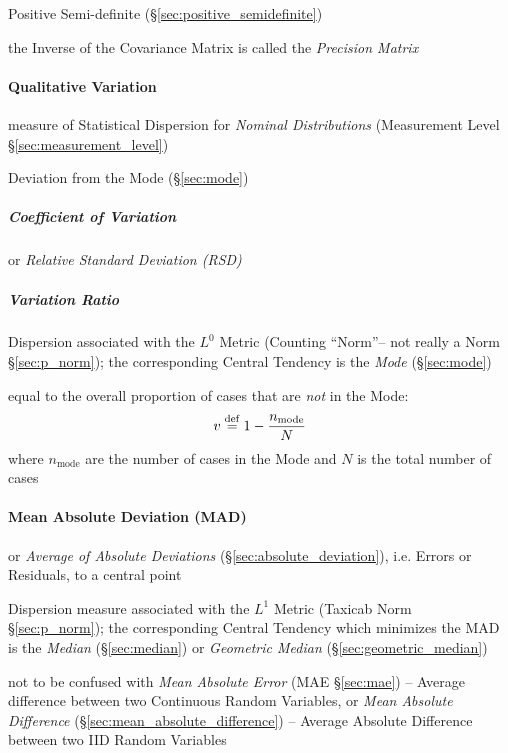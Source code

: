Positive Semi-definite (\S\ref{sec:positive_semidefinite})

the Inverse of the Covariance Matrix is called the \emph{Precision Matrix}



\paragraph{Qualitative Variation}\label{sec:qualitative_variation}\hfill

measure of Statistical Dispersion for \emph{Nominal Distributions}
(Measurement Level \S\ref{sec:measurement_level})

Deviation from the Mode (\S\ref{sec:mode})



\subparagraph{Coefficient of Variation}\label{sec:variation_coefficient}\hfill

or \emph{Relative Standard Deviation (RSD)}



\subparagraph{Variation Ratio}\label{sec:variation_ratio}\hfill

Dispersion associated with the $L^0$ Metric (Counting ``Norm''-- not really a
Norm \S\ref{sec:p_norm}); the corresponding Central Tendency is the \emph{Mode}
(\S\ref{sec:mode})

equal to the overall proportion of cases that are \emph{not} in the Mode:
\[
  v \stackrel{\mathrm{def}}= 1 - \frac{n_{\text{mode}}}{N}
\]
where $n_{\text{mode}}$ are the number of cases in the Mode and $N$ is the total
number of cases



\paragraph{Mean Absolute Deviation (MAD)}\label{sec:mad}\hfill

or \emph{Average of Absolute Deviations} (\S\ref{sec:absolute_deviation}), i.e.
Errors or Residuals, to a central point

Dispersion measure associated with the $L^1$ Metric (Taxicab Norm
\S\ref{sec:p_norm}); the corresponding Central Tendency which minimizes the MAD
is the \emph{Median} (\S\ref{sec:median}) or \emph{Geometric Median}
(\S\ref{sec:geometric_median})

\fist not to be confused with \emph{Mean Absolute Error} (MAE \S\ref{sec:mae})
-- Average difference between two Continuous Random Variables,
or \emph{Mean Absolute Difference} (\S\ref{sec:mean_absolute_difference}) --
Average Absolute Difference between two IID Random Variables

